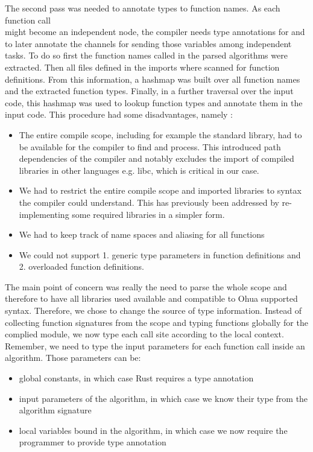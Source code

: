 The second pass was needed to annotate types to function names. As each function call\\  might become an independent node, the compiler needs type annotations for  and  to later annotate the channels for sending those variables among independent tasks. To do so first the function names called in the parsed algorithms were extracted. Then all files defined in the imports where scanned for function definitions. From this information, a hashmap was built over all function names and the extracted function types. Finally, in a further traversal over the input code, this hashmap was used to lookup function types and annotate them in the input code. This procedure had some disadvantages, namely : 

\begin{itemize}
    \item The entire compile scope, including for example the standard library, had to be available for the compiler to find and process. This introduced path dependencies of the compiler and notably excludes the import of compiled libraries in other languages e.g. libc, which is critical in our case.
    \item We had to restrict the entire compile scope and imported libraries to syntax the compiler could understand. This has previously been addressed by re-implementing some required libraries in a simpler form. 
    \item We had to keep track of name spaces and aliasing for all functions
    \item We could not support 1. generic type parameters in function definitions and 2. overloaded function definitions.
\end{itemize}

The main point of concern was really the need to parse the whole scope and therefore to have all libraries used available and compatible to Ohua supported syntax. Therefore, we chose to change the source of type information. Instead of collecting function signatures from the scope and typing functions globally for the complied module, we now type each call site according to the local context. Remember, we need to type the input parameters for each function call inside an algorithm. Those parameters can be: 

\begin{itemize}
    \item global constants, in which case Rust requires a type annotation
    \item input parameters of the algorithm, in which case we know their type from the algorithm signature
    \item local variables bound in the algorithm, in which case we now require the programmer to provide type annotation 
\end{itemize}

